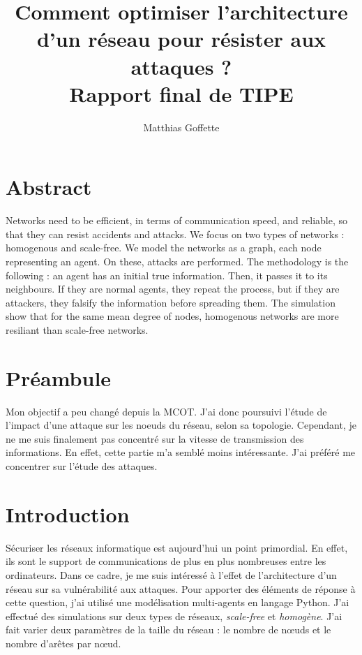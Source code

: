 \documentclass[12pt,a4paper]{article}
\title{Comment optimiser l'architecture d'un réseau pour résister aux attaques ?\\
  Rapport final de TIPE}
\author{Matthias Goffette}
\begin{document}
\maketitle

\section*{Abstract} %

	Networks need to be efficient, in terms of communication speed, and reliable, so that they can resist accidents and attacks. We focus on two types of networks : homogenous and scale-free. We model the networks as a graph, each node representing an agent. On these, attacks are performed. The methodology is the following : an agent has an initial true information. Then, it passes it to its neighbours. If they are normal agents, they repeat the process, but if they are attackers, they falsify the information before spreading them. The simulation show that for the same mean degree of nodes, homogenous networks are more resiliant than scale-free networks.



\section{Préambule} %

Mon objectif a peu changé depuis la MCOT.
J'ai donc poursuivi l'étude de l'impact d'une attaque sur les noeuds du réseau, selon sa topologie.
Cependant, je ne me suis finalement pas concentré sur la vitesse de transmission des informations.
En effet, cette partie m'a semblé moins intéressante.
J'ai préféré me concentrer sur l'étude des attaques.


\section{Introduction} %


Sécuriser les réseaux informatique est aujourd'hui un point primordial.
En effet, ils sont le support de communications de plus en plus nombreuses entre les ordinateurs.
Dans ce cadre, je me suis intéressé à l'effet de l'architecture d'un réseau sur sa vulnérabilité aux attaques.
Pour apporter des éléments de réponse à cette question, j'ai utilisé une modélisation multi-agents en langage Python.
J'ai effectué des simulations sur deux types de réseaux, \emph{scale-free} et \emph{homogène}.
J'ai fait varier deux paramètres de la taille du réseau : le nombre de nœuds et le nombre d'arêtes par nœud.  
\end{document}
